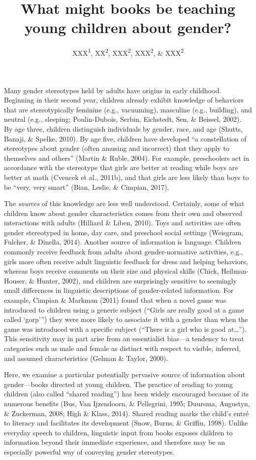 \documentclass[
  english,
  ,man,floatsintext]{apa6}
\affiliation{
\vspace{0.5cm}
\textsuperscript{1} XXX\\\textsuperscript{2} XXX}
\title{What might books be teaching young children about gender?}
\author{XXX\textsuperscript{1}, XX\textsuperscript{2}, XXX\textsuperscript{2}, XXX\textsuperscript{2}, \& XXX\textsuperscript{2}}
\date{}
\begin{document}
\maketitle

Many gender stereotypes held by adults have origins in early childhood. Beginning in their second year, children already exhibit knowledge of behaviors that are stereotypically feminine (e.g., vacuuming), masculine (e.g., building), and neutral (e.g., sleeping; Poulin-Dubois, Serbin, Eichstedt, Sen, \& Beissel, 2002). By age three, children distinguish individuals by gender, race, and age (Shutts, Banaji, \& Spelke, 2010). By age five, children have developed \enquote{a constellation of stereotypes about gender (often amusing and incorrect) that they apply to themselves and others} (Martin \& Ruble, 2004). For example, preschoolers act in accordance with the stereotype that girls are better at reading while boys are better at math (Cvencek et al., 2011b), and that girls are less likely than boys to be \enquote{very, very smart} (Bian, Leslie, \& Cimpian, 2017).

The \emph{sources} of this knowledge are less well understood. Certainly, some of what children know about gender characteristics comes from their own and observed interactions with adults (Hilliard \& Liben, 2010). Toys and activities are often gender stereotyped in home, day care, and preschool social settings (Weisgram, Fulcher, \& Dinella, 2014). Another source of information is language. Children commonly receive feedback from adults about gender-normative activities, e.g., girls more often receive adult linguistic feedback for dress and helping behaviors, whereas boys receive comments on their size and physical skills (Chick, Heilman-Houser, \& Hunter, 2002), and children are surprisingly sensitive to seemingly small differences in linguistic descriptions of gender-related information. For example, Cimpian \& Markman (2011) found that when a novel game was introduced to children using a generic subject (\enquote{Girls are really good at a game called \enquote{gorp}}) they were more likely to associate it with a gender than when the game was introduced with a specific subject (\enquote{There is a girl who is good at\ldots{}}). This sensitivity may in part arise from an essentialist bias---a tendency to treat categories such as male and female as distinct with respect to visible, inferred, and assumed characteristics (Gelman \& Taylor, 2000).

Here, we examine a particular potentially pervasive source of information about gender---books directed at young children. The practice of reading to young children (also called \enquote{shared reading}) has been widely encouraged because of its numerous benefits (Bus, Van Ijzendoorn, \& Pellegrini, 1995; Duursma, Augustyn, \& Zuckerman, 2008; High \& Klass, 2014). Shared reading marks the child's entré to literacy and facilitates its development (Snow, Burns, \& Griffin, 1998). Unlike everyday speech to children, linguistic input from books exposes children to information beyond their immediate experience, and therefore may be an especially powerful way of conveying gender stereotypes.
\end{document}
